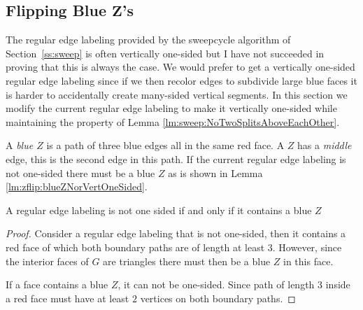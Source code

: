 
\subsection[Flipping Blue $\mathrm{Z}$'s]{Flipping Blue $\mathbf{Z}$'s}
\thispagestyle{plain}
\label{ss:flipBlueZ}

  The regular edge labeling provided by the sweepcycle algorithm of Section~\ref{ss:sweep} is often vertically one-sided but I have not succeeded in proving that this is always the case.
  We would prefer to get a vertically one-sided regular edge labeling since if we then recolor edges to subdivide large blue faces it is harder to accidentally create many-sided vertical segments.
  In this section we modify the current regular edge labeling to make it vertically one-sided while maintaining the property of Lemma \ref{lm:sweep:NoTwoSplitsAboveEachOther}.


  A \emph{blue $Z$} is a path of three blue edges all in the same red face. A $Z$ has a \emph{middle} edge, this is the second edge in this path.
  If the current regular edge labeling is not one-sided there must be a blue $Z$ as is shown in Lemma \ref{lm:zflip:blueZNorVertOneSided}.
  \begin{lemma}
    \label{lm:zflip:blueZNorVertOneSided}
    A regular edge labeling is not one sided if and only if it contains a blue $Z$
  \end{lemma}
  \begin{proof}
    Consider a regular edge labeling that is not one-sided, then it contains a red face of which both boundary paths are of length at least $3$.
    However, since the interior faces of $G$ are triangles there must then be a blue $Z$ in this face.

    If a face contains a blue $Z$, it can not be one-sided. Since path of length $3$ inside a red face must have at least $2$ vertices on both boundary paths.
  \end{proof}

